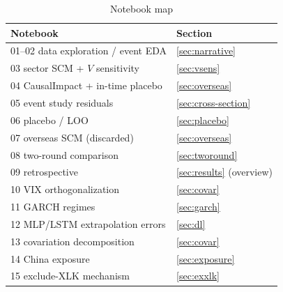 \documentclass[11pt,a4paper]{article}
\begin{document}
\begin{table}[htbp]
\centering
\caption{Notebook map}
\label{tab:notebooks}
\small
\begin{tabular}{@{}ll@{}}
\toprule
Notebook & Section \\
\midrule
01--02 data exploration / event EDA & \ref{sec:narrative} \\
03 sector SCM + $V$ sensitivity & \ref{sec:vsens} \\
04 CausalImpact + in-time placebo & \ref{sec:overseas} \\
05 event study residuals & \ref{sec:cross-section} \\
06 placebo / LOO & \ref{sec:placebo} \\
07 overseas SCM (discarded) & \ref{sec:overseas} \\
08 two-round comparison & \ref{sec:tworound} \\
09 retrospective & \ref{sec:results} (overview) \\
10 VIX orthogonalization & \ref{sec:covar} \\
11 GARCH regimes & \ref{sec:garch} \\
12 MLP/LSTM extrapolation errors & \ref{sec:dl} \\
13 covariation decomposition & \ref{sec:covar} \\
14 China exposure & \ref{sec:exposure} \\
15 exclude-XLK mechanism & \ref{sec:exxlk} \\
\bottomrule
\end{tabular}
\end{table}
\end{document}
